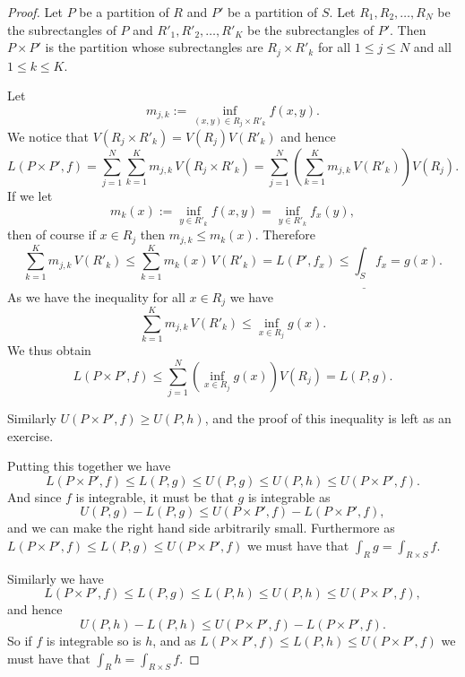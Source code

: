 \documentclass[12pt]{book}
\theoremstyle{plain}
\theoremstyle{remark}
\theoremstyle{definition}
\theoremstyle{exercise}
\theoremstyle{example}
\begin{document}
\begin{proof}
Let $P$ be a partition of $R$ and $P'$ be a partition of $S$.  Let
$R_1,R_2,\ldots,R_N$ be the subrectangles of $P$ and
$R'_1,R'_2,\ldots,R'_K$ be the subrectangles of $P'$.  Then
$P \times P'$ is the partition whose subrectangles are
$R_j \times R'_k$ for all $1 \leq j \leq N$ and all $1 \leq k \leq K$.

Let
\begin{equation*}
m_{j,k} :=
\inf_{(x,y) \in R_j \times R'_k} f(x,y) .
\end{equation*}
We notice that
$V(R_j \times R'_k) = V(R_j)V(R'_k)$ and hence
\begin{equation*}
L(P \times P',f) =
\sum_{j=1}^N
\sum_{k=1}^K
m_{j,k} \, V(R_j \times R'_k)
=
\sum_{j=1}^N
\left(
\sum_{k=1}^K
m_{j,k} \, V(R'_k) \right) V(R_j) .
\end{equation*}
If we let
\begin{equation*}
m_k(x) := \inf_{y \in R'_k} f(x,y) = \inf_{y \in R'_k} f_x(y) ,
\end{equation*}
then of course if $x \in R_j$ then $m_{j,k} \leq m_k(x)$.  Therefore
\begin{equation*}
\sum_{k=1}^K
m_{j,k} \, V(R'_k)
\leq \sum_{k=1}^K m_k(x) \, V(R'_k) = L(P',f_x) \leq
\underline{\int_S} f_x = g(x) .
\end{equation*}
As we have the inequality for all $x \in R_j$ we have
\begin{equation*}
\sum_{k=1}^K
m_{j,k} \, V(R'_k)
\leq \inf_{x \in R_j} g(x) .
\end{equation*}
We thus obtain
\begin{equation*}
L(P \times P',f) 
\leq
\sum_{j=1}^N
\left(
\inf_{x \in R_j} g(x)
\right) V(R_j) = L(P,g) .
\end{equation*}

Similarly $U(P \times P',f) \geq U(P,h)$, and the proof of this inequality is
left as an exercise.

Putting this together we have
\begin{equation*}
L(P \times P',f)
\leq
L(P,g) \leq
U(P,g) \leq
U(P,h) \leq
U(P \times P',f) .
\end{equation*}
And since $f$ is integrable, it must be that $g$ is integrable as
\begin{equation*}
U(P,g) - L(P,g)
\leq
U(P \times P',f) -
L(P \times P',f) ,
\end{equation*}
and we can make the right hand side arbitrarily small.  Furthermore
as 
$L(P \times P',f) \leq L(P,g) \leq U(P \times P',f)$ we must have
that $\int_R g = \int_{R \times S} f$.

Similarly we have
\begin{equation*}
L(P \times P',f)
\leq
L(P,g) \leq
L(P,h) \leq
U(P,h) \leq
U(P \times P',f) ,
\end{equation*}
and hence
\begin{equation*}
U(P,h) - L(P,h)
\leq
U(P \times P',f) -
L(P \times P',f) .
\end{equation*}
So if $f$ is integrable so is $h$, and
as $L(P \times P',f) \leq L(P,h) \leq U(P \times P',f)$ we must have
that $\int_R h = \int_{R \times S} f$.
\end{proof}
\end{document}
